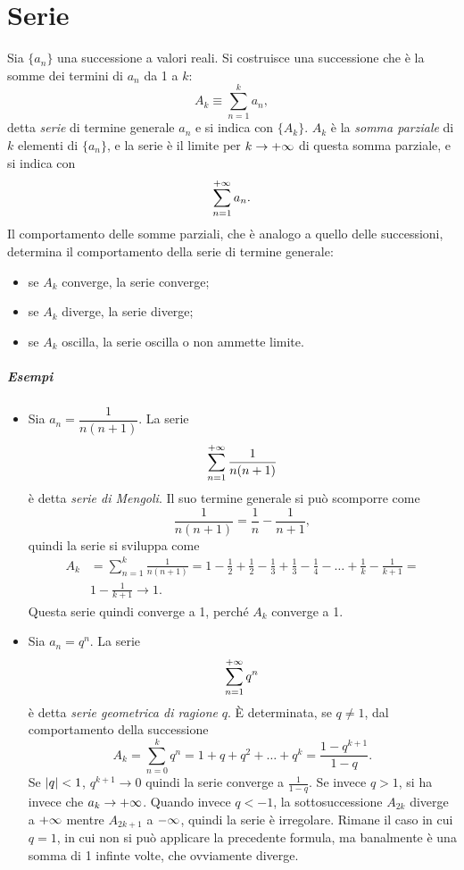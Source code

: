\chapter{Serie}
Sia $\{a_n\}$ una successione a valori reali. Si costruisce una successione che è la somme dei termini di $a_n$ da 1 a $k$:
\[
A_k\equiv\sum_{n=1}^k a_n,
\]
detta \emph{serie} di termine generale $a_n$ e si indica con $\{A_k\}$. $A_k$ è la \emph{somma parziale} di $k$ elementi di $\{a_n\}$, e la serie è il limite per $k\to+\infty$ di questa somma parziale, e si indica con
\[
\sum_{{n}=1}^{+\infty}a_n.
\]
Il comportamento delle somme parziali, che è analogo a quello delle successioni, determina il comportamento della serie di termine generale:
\begin{itemize}
\item se $A_k$ converge, la serie converge;
\item se $A_k$ diverge, la serie diverge;
\item se $A_k$ oscilla, la serie oscilla o non ammette limite.
\end{itemize}
\paragraph{Esempi}
\begin{itemize}
\item Sia $a_n=\dfrac1{n(n+1)}$. La serie
\[
\sum_{{n}=1}^{+\infty}\frac1{n(n+1)}
\]
è detta \emph{serie di Mengoli}. Il suo termine generale si può scomporre come
\[
\frac1{n(n+1)}=\frac1{n}-\frac1{n+1},
\]
quindi la serie si sviluppa come
\[
\begin{split}
A_k&=\sum_{n=1}^k\frac1{n(n+1)}=1-\frac12+\frac12-\frac13+\frac13-\frac14-\dots+\frac1{k}-\frac1{k+1}=\\
&1-\frac1{k+1}\to 1.
\end{split}
\]
Questa serie quindi converge a 1, perché $A_k$ converge a 1.
\item Sia $a_n=q^n$. La serie
\[
\sum_{{n}=1}^{+\infty}q^n
\]
è detta \emph{serie geometrica di ragione} $q$. È determinata, se $q\neq 1$, dal comportamento della successione
\[
A_k=\sum_{n=0}^kq^n=1+q+q^2+\dots+q^k=\frac{1-q^{k+1}}{1-q}.
\]
Se $\left|{q}\right|<1$, $q^{k+1}\to 0$ quindi la serie converge a $\frac1{1-q}$. Se invece $q>1$, si ha invece che $a_k\to+\infty$.
Quando invece $q<-1$, la sottosuccessione $A_{2k}$ diverge a $+\infty$ mentre $A_{2k+1}$ a $-\infty$, quindi la serie è irregolare.
Rimane il caso in cui $q=1$, in cui non si può applicare la precedente formula, ma banalmente è una somma di 1 infinte volte, che ovviamente diverge.
\end{itemize}

